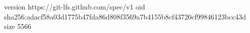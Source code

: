 version https://git-lfs.github.com/spec/v1
oid sha256:adacf58a03d1775b47fda86d808f3569a7b4155b8cf43720cf99846123bcc43d
size 5566
